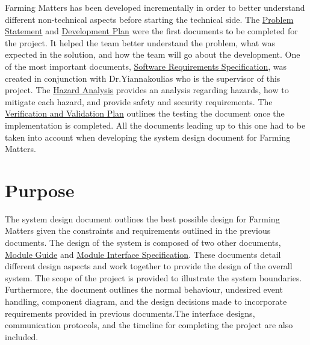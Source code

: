 \documentclass[12pt, titlepage]{article}
\begin{document}
Farming Matters has been developed incrementally in order to better understand different non-technical aspects before starting the technical side. The \href{https://github.com/brandonduong/Farming-Matters/blob/main/docs/ProblemStatementAndGoals/ProblemStatement.pdf}{Problem Statement} and \href{https://github.com/brandonduong/Farming-Matters/blob/main/docs/DevelopmentPlan/DevelopmentPlan.pdf}{Development Plan} were the first documents to be completed for the project. It helped the team better understand the problem, what was expected in the solution, and how the team will go about the development. One of the most important documents, \href{https://github.com/brandonduong/Farming-Matters/blob/main/docs/SRS/SRS.pdf}{Software Requirements Specification}, was created in conjunction with Dr.Yiannakoulias who is the supervisor of this project. The \href{https://github.com/brandonduong/Farming-Matters/blob/main/docs/HazardAnalysis/HazardAnalysis.pdf}{Hazard Analysis} provides an analysis regarding hazards, how to mitigate each hazard, and provide safety and security requirements. The \href{https://github.com/brandonduong/Farming-Matters/blob/main/docs/VnVPlan/VnVPlan.pdf}{Verification and Validation Plan} outlines the testing the document once the implementation is completed. All the documents leading up to this one had to be taken into account when developing the system design document for Farming Matters. 


\section{Purpose}

The system design document outlines the best possible design for Farming Matters given the constraints and requirements outlined in the previous documents. The design of the system is composed of two other documents, \href{https://github.com/brandonduong/Farming-Matters/blob/main/docs/Design/MG/MG.pdf}{Module Guide} and \href{https://github.com/brandonduong/Farming-Matters/blob/main/docs/Design/MIS/MIS.pdf}{Module Interface Specification}. These documents detail different design aspects and work together to provide the design of the overall system. The scope of the project is provided to illustrate the system boundaries. Furthermore, the document outlines the normal behaviour, undesired event handling, component diagram, and the design decisions made to incorporate requirements provided in previous documents.The interface designs, communication protocols, and the timeline for completing the project are also included. 
\end{document}
